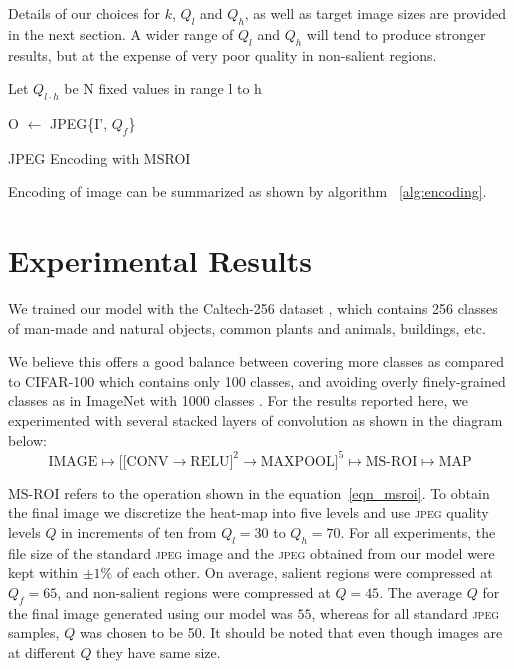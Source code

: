 Details of our choices for $k$, $Q_l$ and $Q_h$, as well as target image sizes are provided in the next section.  A wider range of $Q_l$ and $Q_h$ will tend to produce stronger results, but at the expense of very poor quality in non-salient regions.

\begin{algorithm}

    Let $Q_{l \cdot h}$ be N fixed values in range l to h
    
    O $\gets$ JPEG\{I', $Q_f$\}
\caption[Encoding with MSROI]{JPEG Encoding with MSROI}
\label{alg:encoding}
\end{algorithm}

Encoding of image can be summarized as shown by algorithm ~\ref{alg:encoding}.





\section{Experimental Results}
We trained our model with the Caltech-256 dataset \cite{xxx_griffin2007caltech}, which contains 256 classes of man-made and natural objects, common plants and animals, buildings, etc.

We believe this offers a good balance between covering more classes as compared to CIFAR-100 which contains only 100 classes, and avoiding overly finely-grained classes as in ImageNet with 1000 classes \cite{xxx_imagenet_cvpr09}.
For the results reported here, we experimented with several stacked layers of convolution as shown in the diagram below:
\begin{equation*}
    \text{IMAGE} \longmapsto \bigg[ \big[ \text{CONV} \rightarrow \text{RELU}\big]^2 \rightarrow \text{MAXPOOL} \bigg]^5 \longmapsto \text{MS-ROI} \longmapsto \text{MAP}
\end{equation*}


$\text{MS-ROI}$ refers to the operation shown in the equation~\ref{eqn_msroi}.
To obtain the final image we discretize the heat-map into five levels and use \textsc{jpeg} quality levels $Q$ in increments of ten from $Q_l=30$ to $Q_h=70$.
For all experiments, the file size of the standard \textsc{jpeg} image and the \textsc{jpeg} obtained from our model were kept within $\pm1\%$ of each other.
On average, salient regions were compressed at $Q_f=65$, and non-salient regions were compressed at $Q=45$.
The average $Q$ for the final image generated using our model was $55$, whereas for all standard \textsc{jpeg} samples, $Q$ was chosen to be 50. It should be noted that even though images are at different $Q$ they have same size.

